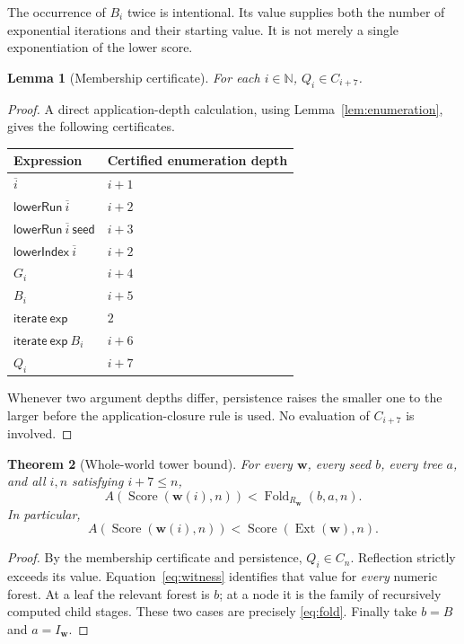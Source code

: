 \documentclass[11pt]{article}
\newtheorem{theorem}{Theorem}[section]
\newtheorem{lemma}[theorem]{Lemma}
\theoremstyle{definition}
\theoremstyle{remark}
\newcommand{\N}{\mathbb N}
\newcommand{\Score}{\operatorname{Score}}
\newcommand{\Ext}{\operatorname{Ext}}
\newcommand{\ctx}{\boldsymbol w}
\begin{document}
The occurrence of $B_i$ twice is intentional. Its value supplies both the
number of exponential iterations and their starting value. It is not merely
a single exponentiation of the lower score.

\begin{lemma}[Membership certificate]\label{lem:witness-depth}
For each $i\in\N$, $Q_i\in C_{i+7}$.
\end{lemma}
\begin{proof}
A direct application-depth calculation, using
Lemma~\ref{lem:enumeration}, gives the following certificates.
\begin{center}
\begin{tabular}{@{}ll@{}}
\toprule
Expression & Certified enumeration depth\\
\midrule
$\overline i$ & $i+1$\\
$\mathsf{lowerRun}\ \overline i$ & $i+2$\\
$\mathsf{lowerRun}\ \overline i\ \mathsf{seed}$ & $i+3$\\
$\mathsf{lowerIndex}\ \overline i$ & $i+2$\\
$G_i$ & $i+4$\\
$B_i$ & $i+5$\\
$\mathsf{iterate}\ \mathsf{exp}$ & $2$\\
$\mathsf{iterate}\ \mathsf{exp}\ B_i$ & $i+6$\\
$Q_i$ & $i+7$\\
\bottomrule
\end{tabular}
\end{center}
Whenever two argument depths differ, persistence raises the smaller one to
the larger before the application-closure rule is used. No evaluation of
$C_{i+7}$ is involved.
\end{proof}

\begin{theorem}[Whole-world tower bound]\label{thm:extend-tower}
For every $\ctx$, every seed $b$, every tree $a$, and all $i,n$ satisfying
$i+7\le n$,
\[
 A(\Score(\ctx(i),n))<
          \operatorname{Fold}_{R_{\ctx}}(b,a,n).
\]
In particular,
\[
 A(\Score(\ctx(i),n))<\Score(\Ext(\ctx),n).
\]
\end{theorem}
\begin{proof}
By the membership certificate and persistence, $Q_i\in C_n$. Reflection
strictly exceeds its value. Equation~\eqref{eq:witness} identifies that value
for \emph{every} numeric forest. At a leaf the relevant forest is $b$; at a
node it is the family of recursively computed child stages. These two cases
are precisely \eqref{eq:fold}. Finally take $b=B$ and $a=I_{\ctx}$.
\end{proof}
\end{document}
